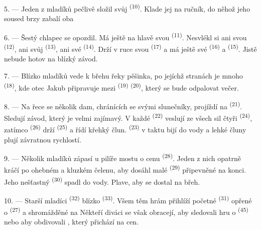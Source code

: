 5. --- Jeden z mladíků pečlivě složil svůj  \textsuperscript{(10)}. Klade jej na
ručník, do něhož jeho soused brzy zabalí oba 

6. --- Šestý chlapec se opozdil. Má ještě na hlavě svou 
\textsuperscript{(11)}. Nesvlékl si ani svou  \textsuperscript{(12)}, ani svůj
 \textsuperscript{(13)}, ani své  \textsuperscript{(14)}. Drží v
ruce svou  \textsuperscript{(17)} a má ještě své 
\textsuperscript{(16)} a  \textsuperscript{(15)}. Jistě nebude hotov na blízký
závod.

7. --- Blízko mladíků vede k břehu řeky pěšinka, po jejíchž stranách je mnoho
 \textsuperscript{(18)}, kde otec Jakub připravuje mezi 
\textsuperscript{(19)}  \textsuperscript{(20)}, který se bude odpalovat
večer.

\VUsaut{4.4mm}
\VUsaut{3.4mm}

8. --- Na řece se několik dam, chránících se svými slunečníky, projíždí na
 \textsuperscript{(21)}. Sledují závod, který je velmi zajímavý. V každé
 \textsuperscript{(22)} veslují ze všech sil čtyři 
\textsuperscript{(24)}, zatímco  \textsuperscript{(26)} drží
 \textsuperscript{(25)} a řídí křehký člun. 
\textsuperscript{(23)} v taktu bijí do vody a lehké čluny plují závratnou rychlostí.

9. --- Několik mladíků zápasí u pilíře mostu o cenu  \textsuperscript{(28)}.
Jeden z nich opatrně kráčí po ohebném a kluzkém čelenu, aby dosáhl malé 
\textsuperscript{(29)} připevněné na konci. Jeho nešťastný 
\textsuperscript{(30)} spadl do vody. Plave, aby se dostal na břeh.

10. --- Starší mladíci  \textsuperscript{(32)} blízko
 \textsuperscript{(33)}. Všem těm hrám přihlíží početné
 \textsuperscript{(31)} opřené o 
 \textsuperscript{(27)} a shromážděné na  Někteří diváci
se však obracejí, aby sledovali hru o  \textsuperscript{(45)} nebo aby
obdivovali , který přichází na
 cen.

